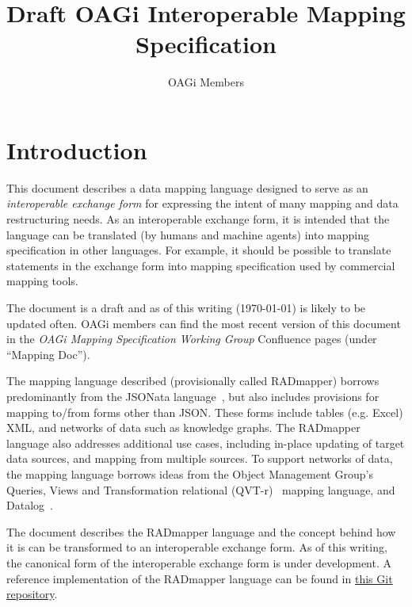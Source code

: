 \documentclass[9pt,letterpaper]{article}
\begin{document}
\title{Draft OAGi Interoperable Mapping Specification}
\author{OAGi Members}
\maketitle

\section{Introduction}
This document describes a data mapping language designed to serve as an \textit{interoperable exchange form} for expressing the intent of many mapping and data restructuring needs.
As an interoperable exchange form, it is intended that the language can be translated (by humans and machine agents) into mapping specification in other languages.
For example, it should be possible to translate statements in the exchange form into mapping specification used by commercial mapping tools.

The document is a draft and as of this writing (\today) is likely to be updated often.
OAGi members can find the most recent version of this document in the \textit{OAGi Mapping Specification Working Group} Confluence pages (under ``Mapping Doc'').

The mapping language  described (provisionally called RADmapper) borrows predominantly from the JSONata language~\cite{Jsonata.org2021}, but also includes provisions for mapping to/from forms other than JSON.\@
These forms include tables (e.g. Excel) XML, and networks of data such as knowledge graphs.
The RADmapper language also addresses additional use cases, including in-place updating of target data sources, and mapping from multiple sources.
To support networks of data, the mapping language borrows ideas from the Object Management Group's Queries, Views and Transformation relational (QVT-r)~\cite{ObjectManagementGroup2016b} mapping language, and Datalog~\cite{Abiteboul1995a}.

The document describes the RADmapper language and the concept behind how it is can be transformed to an interoperable exchange form.
As of this writing, the canonical form of the interoperable exchange form is under development.
A reference implementation of the RADmapper language can be found in \href{https://github.com/pdenno/RADmapper}{this Git repository}.  %
\end{document}
